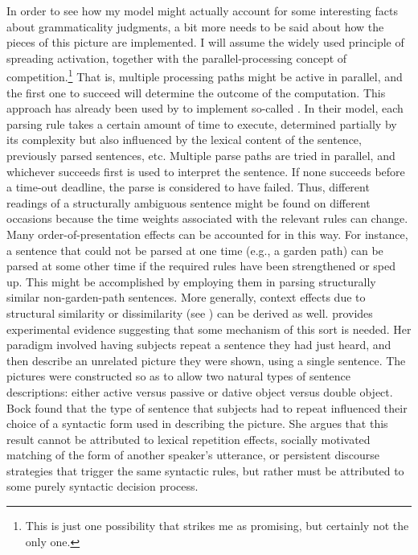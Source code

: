  In order to see how my model might actually account for some interesting facts about grammaticality judgments, a bit more needs to be said about how the pieces of this picture are implemented. I will assume the widely used principle of spreading activation, together with the parallel-processing concept of competition.\footnote{This is just one possibility that strikes me as promising, but certainly not the only  one.}
 That is, multiple processing paths might be active in parallel, and the first one to succeed will determine the outcome of the computation. This approach has already been used by \citet{McRoyEtAl1990} to implement so-called . In their model, each parsing rule takes a certain amount of time to execute, determined partially by its complexity but also influenced by the lexical content of the sentence, previously parsed sentences, etc. Multiple parse paths are tried in parallel, and whichever succeeds first is used to interpret the sentence. If none succeeds before a time-out deadline, the parse is considered to have failed. Thus, different readings of a structurally ambiguous sentence might be found on different occasions because the time weights associated with the relevant rules can change. Many order-of-presentation effects can be accounted for in this way. For instance, a sentence that could not be parsed at one time (e.g., a garden path) can be parsed at some other time if the required rules have been strengthened or sped up. This might be accomplished by employing them in parsing structurally similar non-garden-path sentences. More generally, context effects due to structural similarity or dissimilarity (see ) can be derived as well. \citet{Bock1986} provides experimental evidence suggesting that some mechanism of this sort is needed. Her paradigm involved having subjects repeat a sentence they had just heard, and then describe an unrelated picture they were shown, using a single sentence. The pictures were constructed so as to allow two natural types of sentence descriptions: either active versus passive or dative object versus double object. Bock found that the type of sentence that subjects had to repeat influenced their choice of a syntactic form used in describing the picture. She argues that this result cannot be attributed to lexical repetition effects, socially motivated matching of the form of another speaker's utterance, or persistent discourse strategies that trigger the same syntactic rules, but rather must be attributed to some purely syntactic decision process.

